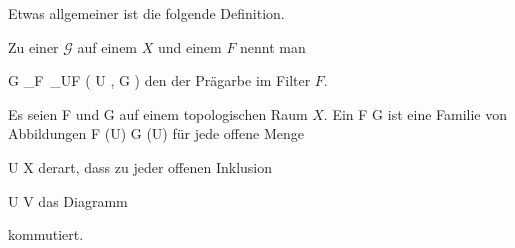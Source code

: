  {  }


Etwas allgemeiner ist die folgende Definition.


{}
{





Zu einer
${ \mathcal  G   }$ auf einem
$X$ und einem
$F$ nennt man

\mavergleichskettedisp
{\vergleichskette
{ { \mathcal  G   }_F
}
{ } { \,_{U\in F } \Gamma   \left(   U ,  { \mathcal  G   }  \right)
}
{ } {
}
{ } {
}
{ } {
}
}
{}{}{}
den
der Prägarbe im Filter $F$.





}







{}
{





Es seien
\mathkor {} {{ \mathcal  F   }} {und} {{ \mathcal  G   }} {}
auf einem topologischen Raum $X$. Ein
\maabbdisp {\varphi} { { \mathcal  F   }  } { { \mathcal  G   }
} {}
ist eine Familie von Abbildungen
 { { \mathcal  F   } (U) } { { \mathcal  G   } (U)
} {}
für jede offene Menge

\mavergleichskette
{\vergleichskette
{U
}
{ \subseteq }{ X
}
{  }{
}
{    }{
}
{   }{
}
}
{}{}{}
derart, dass zu jeder offenen Inklusion

\mavergleichskette
{\vergleichskette
{U
}
{ \subseteq }{ V
}
{  }{
}
{    }{
}
{   }{
}
}
{}{}{}
das Diagramm

 {  }




kommutiert.





}


